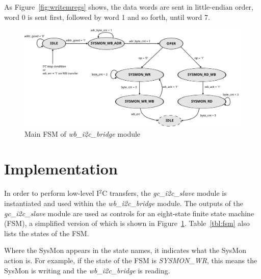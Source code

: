 \documentclass[a4paper,11pt]{article}
\begin{document}
As Figure~\ref{fig:writemregs} shows, the data words are sent in little-endian order,
word 0 is sent first, followed by word 1 and so forth, until word 7.

\begin{figure}[h]
  \centerline{\includegraphics[width=\textwidth]{fig/fsm}}
  \caption{Main FSM of \textit{wb\_i2c\_bridge} module}
  \label{fig:fsm}
\end{figure}

\section{Implementation}
\label{sec:implem}

In order to perform low-level I$^2$C transfers, the \textit{gc\_i2c\_slave} module
is instantiated and used within the \textit{wb\_i2c\_bridge} module. The outputs
of the \textit{gc\_i2c\_slave} module  are used as controls for an eight-state finite
state machine (FSM), a simplified version of which is shown in Figure~\ref{fig:fsm}.
Table~\ref{tbl:fsm} also lists the states of the FSM.

Where the SysMon appears in the state names, it indicates what the SysMon action is.
For example, if the state of the FSM is \textit{SYSMON\_WR}, this means the SysMon
is writing and the \textit{wb\_i2c\_bridge} is reading.
\end{document}
